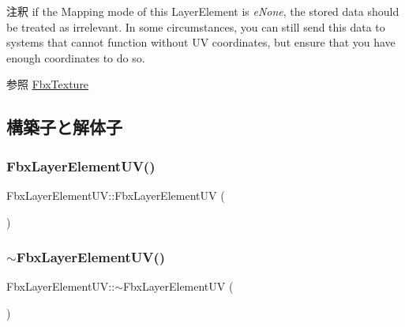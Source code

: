 \begin{DoxyRemark}{注釈}
if the Mapping mode of this Layer\+Element is {\itshape e\+None}, the stored data should be treated as irrelevant. In some circumstances, you can still send this data to systems that cannot function without UV coordinates, but ensure that you have enough coordinates to do so.
\end{DoxyRemark}
\begin{DoxySeeAlso}{参照}
\hyperlink{class_fbx_texture}{Fbx\+Texture} 
\end{DoxySeeAlso}


\subsection{構築子と解体子}
\mbox{\label{class_fbx_layer_element_u_v_aaae1d6237b2f507a37344bc53f7667b0}} 
\subsubsection{\texorpdfstring{Fbx\+Layer\+Element\+U\+V()}{FbxLayerElementUV()}}
{\footnotesize\ttfamily Fbx\+Layer\+Element\+U\+V\+::\+Fbx\+Layer\+Element\+UV (\begin{DoxyParamCaption}{ }\end{DoxyParamCaption})\hspace{0.3cm}{\ttfamily [protected]}}

\mbox{\label{class_fbx_layer_element_u_v_a2906e0439687d1a8aa41b1f68c0990d7}} 
\subsubsection{\texorpdfstring{$\sim$\+Fbx\+Layer\+Element\+U\+V()}{~FbxLayerElementUV()}}
{\footnotesize\ttfamily Fbx\+Layer\+Element\+U\+V\+::$\sim$\+Fbx\+Layer\+Element\+UV (\begin{DoxyParamCaption}{ }\end{DoxyParamCaption})\hspace{0.3cm}{\ttfamily [protected]}}



